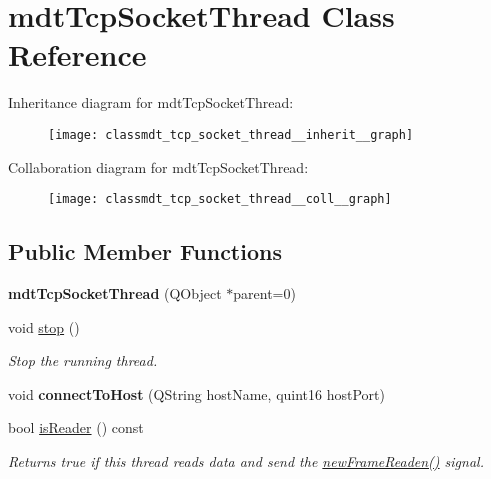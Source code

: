 \hypertarget{classmdt_tcp_socket_thread}{
\section{mdtTcpSocketThread Class Reference}
\label{classmdt_tcp_socket_thread}
}


Inheritance diagram for mdtTcpSocketThread:\nopagebreak
\begin{figure}[H]
\begin{center}
\leavevmode
\texttt{[image: classmdt\_tcp\_socket\_thread\_\_inherit\_\_graph]}
\end{center}
\end{figure}


Collaboration diagram for mdtTcpSocketThread:\nopagebreak
\begin{figure}[H]
\begin{center}
\leavevmode
\texttt{[image: classmdt\_tcp\_socket\_thread\_\_coll\_\_graph]}
\end{center}
\end{figure}
\subsection*{Public Member Functions}
\begin{DoxyCompactItemize}
\item 
\hypertarget{classmdt_tcp_socket_thread_ab379d78b2d32a9361dbe46a009c687d4}{
{\bfseries mdtTcpSocketThread} (QObject $\ast$parent=0)}
\label{classmdt_tcp_socket_thread_ab379d78b2d32a9361dbe46a009c687d4}

\item 
void \hyperlink{classmdt_tcp_socket_thread_a0fd2b3f8b497427d84ae358c6f72122e}{stop} ()
\begin{DoxyCompactList}\small\item\em Stop the running thread. \end{DoxyCompactList}\item 
\hypertarget{classmdt_tcp_socket_thread_a48db12819fd049de833c4789ebed134a}{
void {\bfseries connectToHost} (QString hostName, quint16 hostPort)}
\label{classmdt_tcp_socket_thread_a48db12819fd049de833c4789ebed134a}

\item 
bool \hyperlink{classmdt_tcp_socket_thread_a3224f12c8ff8d695975030f3f6215010}{isReader} () const 
\begin{DoxyCompactList}\small\item\em Returns true if this thread reads data and send the \hyperlink{classmdt_port_thread_a7fc2245c753fd65e1beffec211c41461}{newFrameReaden()} signal. \end{DoxyCompactList}\end{DoxyCompactItemize}


